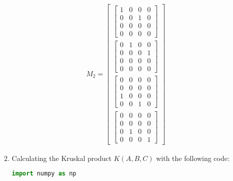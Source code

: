 \documentclass[11pt,a4paper]{article}
\begin{document}
\begin{enumerate}
\begin{enumerate}
                    \begin{align*}
                        M_2 = \begin{bmatrix}
                                  \begin{bmatrix}
                                1 & 0 & 0 & 0 \\
                                0 & 0 & 1 & 0 \\
                                0 & 0 & 0 & 0 \\
                                0 & 0 & 0 & 0
                            \end{bmatrix} \\
                                  \begin{bmatrix}
                                0 & 1 & 0 & 0 \\
                                0 & 0 & 0 & 1 \\
                                0 & 0 & 0 & 0 \\
                                0 & 0 & 0 & 0
                            \end{bmatrix} \\
                                  \begin{bmatrix}
                                0 & 0 & 0 & 0 \\
                                0 & 0 & 0 & 0 \\
                                1 & 0 & 0 & 0 \\
                                0 & 0 & 1 & 0
                            \end{bmatrix} \\
                                  \begin{bmatrix}
                                0 & 0 & 0 & 0 \\
                                0 & 0 & 0 & 0 \\
                                0 & 1 & 0 & 0 \\
                                0 & 0 & 0 & 1
                            \end{bmatrix}
                              \end{bmatrix}
                    \end{align*}
                    \newpage
              \item Calculating the Kruskal product $K(A, B, C)$ with the following code:

                    \begin{lstlisting}[language=Python]
import numpy as np
                        

\end{lstlisting}
\end{enumerate}
\end{enumerate}
\end{document}
